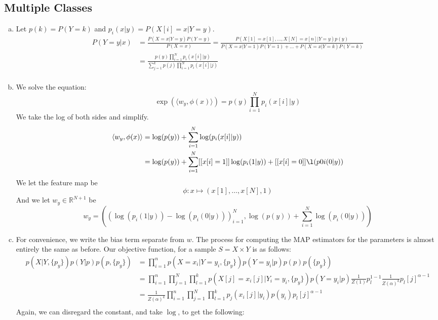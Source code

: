 \documentclass{amsart}
\newcommand{\rr}{\mathbb{R}}    %
\theoremstyle{definition}
\begin{document}
\subsection{Multiple Classes}
\begin{enumerate}[(a)]
	\item 
		Let $p(k) = P(Y = k)$ and $p_i(x|y) = P(X[i] = x|Y = y)$.
		\begin{align*}
			P(Y = y|x) &= \frac{P(X = x|Y = y) P(Y = y)}{P(X = x)} = \frac{P(X[1] = x[1], \ldots, X[N] = x[n]| Y = y)p(y)}{P(X=x|Y = 1) P(Y = 1) + \ldots + P(X=x| Y = k)P(Y=k)}\\
			&= \frac{p(y)\prod_{i=1}^{N}p_i(x[i]|y)}{\sum_{j=1}^{k} p(j)\prod_{i=1}^{N}p_i(x[i]|j)}\\
		\end{align*}
	\item
		We solve the equation:
		\[\exp(\langle w_y, \phi(x)\rangle) = p(y) \prod_{i=1}^{N}p_i(x[i]|y)\]
		We take the log of both sides and simplify.
		\begin{align*}
			\langle w_y, \phi(x)\rangle &= \log(p(y)) + \sum_{i=1}^{N} \log(p_i(x[i]|y))\\
			&= \log(p(y)) + \sum_{i=1}^{N} [[x[i] = 1]]\log(p_i(1|y)) + [[x[i] = 0]] \l(p0i(0|y))\\
		\end{align*}
		We let the feature map be 
		\[\phi: x \mapsto (x[1], \ldots, x[N], 1)\]
		And we let $w_y \in \rr^{N+1}$ be 
		\[w_y = \left((\log(p_i(1|y)) - \log(p_i(0|y)))_{i=1}^N, \log(p(y)) + \sum_{i=1}^{N} \log(p_i(0|y)) \right)\]
	\item 
		For convenience, we write the bias term separate from $w$. 
		The process for computing the MAP estimators for the parameters is almost entirely the same as before.
		Our objective function, for a sample $S = X \times Y$ is as follows:
		\begin{align*}
			p(X|Y, \{p_y\})p(Y|p)p(p, \{p_y\}) &= \prod_{i=1}^{n} p(X = x_i|Y = y_i, \{p_y\})p(Y = y_i|p)p(p) p(\{p_y\})\\
			&= \prod_{i=1}^{n} \prod_{j=1}^{N}\prod_{l=1}^k p(X[j] = x_i[j]|Y_i = y_i, \{p_y\})p(Y = y_i|p)\frac{1}{Z(1)}p_l^{1 - 1} \frac{1}{Z(\alpha)^k}p_l[j]^{\alpha - 1}\\
			&= \frac{1}{Z(\alpha)^k}\prod_{i=1}^{n} \prod_{j=1}^{N}\prod_{l=1}^k p_j(x_i[j]|y_i)p(y_i)p_l[j]^{\alpha - 1}\\
		\end{align*}
		Again, we can disregard the constant, and take $\log$, to get the following:
		\begin{align*}

\end{align*}
\end{enumerate}
\end{document}
